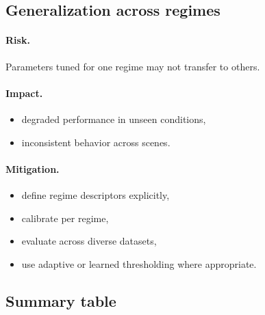 \documentclass[11pt,letterpaper]{article}
\theoremstyle{gcresult}
\theoremstyle{definition}
\begin{document}

\subsection{Generalization across regimes}

\paragraph{Risk.}
Parameters tuned for one regime may not transfer to others.

\paragraph{Impact.}
\begin{itemize}[leftmargin=1.5em]
    \item degraded performance in unseen conditions,
    \item inconsistent behavior across scenes.
\end{itemize}

\paragraph{Mitigation.}
\begin{itemize}[leftmargin=1.5em]
    \item define regime descriptors explicitly,
    \item calibrate per regime,
    \item evaluate across diverse datasets,
    \item use adaptive or learned thresholding where appropriate.
\end{itemize}


\subsection{Summary table}
\end{document}
